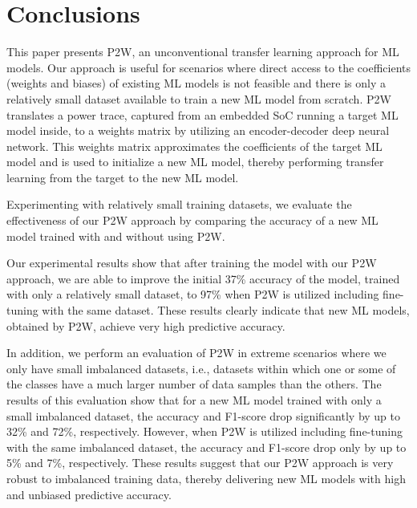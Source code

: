 \documentclass[letterpaper]{article}
\begin{document}
\section{Conclusions}
\label{sec:Conclusions}



This paper presents P2W, an unconventional transfer learning approach for ML models. Our approach is useful for scenarios where direct access to the coefficients (weights and biases) of existing ML models is not feasible and there is only a relatively small dataset available to train a new ML model from scratch. P2W translates a power trace, captured from an embedded SoC running a target ML model inside, to a weights matrix by utilizing an encoder-decoder deep neural network. This weights matrix approximates the coefficients of the target ML model and is used to initialize a new ML model, thereby performing transfer learning from the target to the new ML model.


Experimenting with relatively small training datasets, we evaluate the effectiveness of our P2W approach by comparing the accuracy of a new ML model trained
with and without using P2W. 

Our experimental results show that after training the model with our P2W approach, we are able to improve the initial 37\% accuracy of the model, trained with only a relatively small dataset, to 97\% when P2W is utilized including fine-tuning with the same dataset. These results  clearly indicate
that new ML models, obtained by P2W, achieve very high predictive accuracy.

In addition, we perform an evaluation of P2W in extreme scenarios where we only have small imbalanced datasets, i.e., datasets within which one or some of the classes have a much larger number of data samples than the others. The results of this evaluation show that for a new ML model trained with only a small imbalanced dataset, the accuracy and F1-score drop significantly by up to 32\% and 72\%, respectively. However, when P2W is utilized including fine-tuning with the same imbalanced dataset, the accuracy and F1-score drop only by up to 5\% and 7\%, respectively. These results suggest that our P2W approach is very robust to imbalanced training data, thereby delivering new ML models with high and unbiased predictive accuracy.     


 
  
\end{document}
